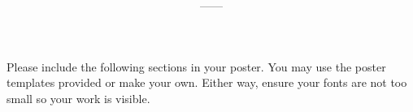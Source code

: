 \documentclass[11pt,onecolumn]{article}
\title{\textbf{\coursename}}
\author{{\semester}---{\roomnumb}---{\classtimes}}
\date{}
\makeatletter
\newcommand{\myname}{A.~Grant Schissler}
\newcommand{\myemail}{aschissler@unr.edu}
\newcommand{\office}{DMSC 224}
\newcommand{\officehours}{Tue 4pm-5pm, Wed 4pm-5pm, or by appointment}
\makeatother
\begin{document}
\maketitle

\vspace{-0.25in}
\noindent\makebox[\linewidth]{\rule{\textwidth}{1pt}}


Please include the following sections in your poster. You may use the poster templates provided or make your own. Either way, ensure your fonts are not too small so your work is visible.
\end{document}
